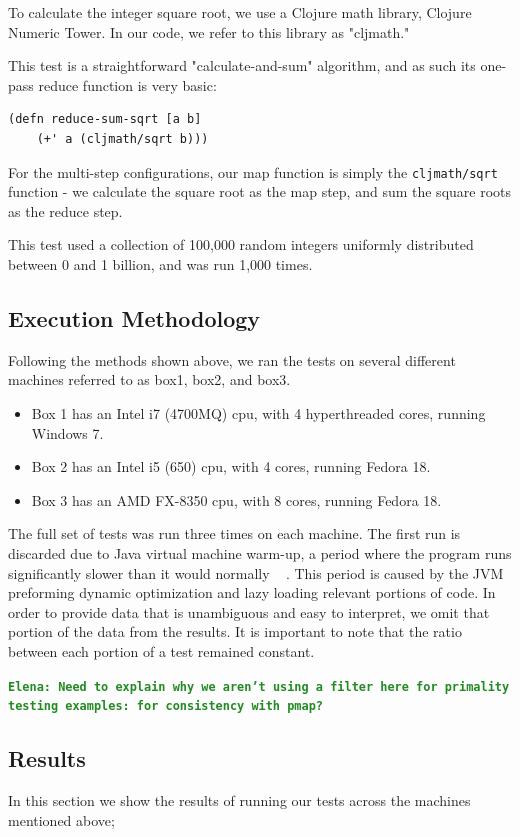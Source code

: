 \documentclass[12pt]{article}
\newcommand{\comment}[1]{{\bf \tt  {#1}}}
\newcommand{\emcomment}[1]{\textcolor{ForestGreen}{\comment{Elena: {#1}}}}
\begin{document}
To calculate the integer square root, we use a Clojure math library, Clojure Numeric Tower. In our code, we refer to this library as "cljmath."

This test is a straightforward "calculate-and-sum" algorithm, and as such its one-pass reduce function is very basic:

\begin{verbatim}
(defn reduce-sum-sqrt [a b] 
    (+' a (cljmath/sqrt b)))
\end{verbatim}

For the multi-step configurations, our map function is simply the \texttt{cljmath/sqrt} function - we calculate the square root as the map step, and sum the square roots as the reduce step.
 
This test used a collection of 100,000 random integers uniformly distributed between 0 and 1 billion, and was run 1,000 times.
 
 \subsection{Execution Methodology}\label{sec:eMethods}
 Following the methods shown above, we ran the tests on several different machines referred to as box1, box2, and box3.
 
\begin{itemize}
 \item 
 Box 1 has an Intel i7 (4700MQ) cpu, with 4 hyperthreaded cores, running Windows 7.
 \item
 Box 2 has an Intel i5 (650) cpu, with 4 cores, running Fedora 18.
 \item
 Box 3 has an AMD FX-8350 cpu, with 8 cores, running Fedora 18. 
 \end{itemize}
  
The full set of tests was run three times on each machine. The first run is discarded due to Java virtual machine warm-up, a period where the program runs significantly slower than it would normally ~\cite{Blackburn:2008} . This period is caused by the JVM preforming dynamic optimization and lazy loading relevant portions of code. In order to provide data that is unambiguous and easy to interpret, we omit that portion of the data from the results. It is important to note that the ratio between each portion of a test remained constant.

\emcomment{Need to explain why we aren't using a filter here for primality testing examples: for consistency with pmap?}

\subsection{Results}\label{sec:results}
In this section we show the results of running our tests across the machines mentioned above;
\end{document}
